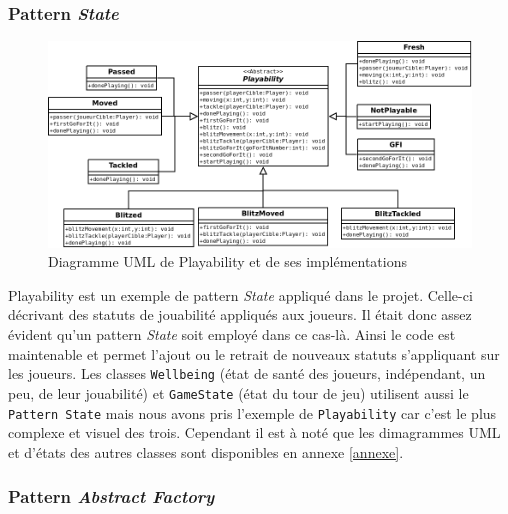 \documentclass{article}
\newcommand{\info}{\texttt}
\newcommand{\pattern}{\emph}
\begin{document}
        \subsubsection{Pattern \pattern{State}}
        
            \begin{figure}[H]
                \centerline{\includegraphics[scale=0.5]{img/PlayabilityState.png}}
                \caption{\label{DiaPlayability} Diagramme UML de Playability et de ses implémentations}
            \end{figure}
            
            Playability est un exemple de pattern \pattern{State} appliqué dans le projet. Celle-ci décrivant des statuts de jouabilité appliqués aux joueurs. Il était donc assez évident qu'un pattern \pattern{State} soit employé dans ce cas-là. Ainsi le code est maintenable et permet l'ajout ou le retrait de nouveaux statuts s'appliquant sur les joueurs. Les classes \info{Wellbeing} (état de santé des joueurs, indépendant, un peu, de leur jouabilité) et \info{GameState} (état du tour de jeu) utilisent aussi le \info{Pattern State} mais nous avons pris l'exemple de \info{Playability} car c'est le plus complexe et visuel des trois. Cependant il est à noté que les dimagrammes UML et d'états des autres classes sont disponibles en annexe \ref{annexe}.
        
        \subsubsection{Pattern \pattern{Abstract Factory}}
        
\end{document}
